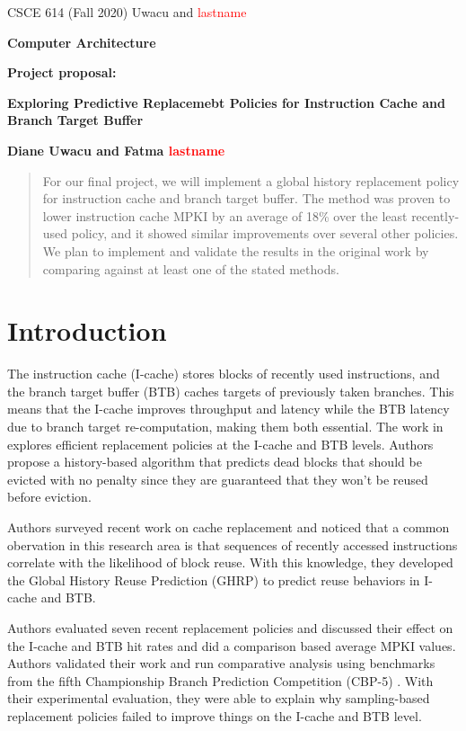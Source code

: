 \documentclass[11pt]{article}
\begin{document}
\centerline{CSCE 614 (Fall 2020) \hfill Uwacu and \textcolor{red}{lastname}}
\medskip
\centerline{\bf Computer Architecture}
\medskip

\centerline{\bf  Project proposal: }

\bigskip

\centerline{\bf Exploring Predictive Replacemebt Policies for Instruction Cache and Branch Target Buffer}

\bigskip

\centerline{\bf Diane Uwacu and Fatma \textcolor{red}{lastname}}

\bigskip

\begin{abstract}
	For our final project, we will implement a global history replacement policy for instruction cache and branch target buffer.
	The method was proven to lower instruction cache MPKI by an average of 18\% over the least recently-used policy, and it showed
	similar improvements over several other policies.
	We plan to implement and validate the results in the original work by comparing against at least one of the stated methods.
 \end{abstract}

\section{Introduction} 
The instruction cache (I-cache) stores blocks of recently used instructions, and the branch target buffer (BTB) caches targets of previously taken branches. 
This means that the I-cache improves throughput and latency while the BTB latency due to branch target re-computation, making them both essential.
The work in \cite{samira-ISCA18} explores efficient replacement policies at the I-cache and BTB levels. Authors propose a history-based algorithm that predicts
dead blocks that should be evicted with no penalty since they are guaranteed that they won't be reused before eviction.

Authors surveyed recent work on cache replacement and noticed that a common obervation in this research area is that sequences of recently accessed instructions
correlate with the likelihood of block reuse. With this knowledge, they developed the Global History Reuse Prediction (GHRP) to predict reuse behaviors in I-cache and BTB.

Authors evaluated seven recent replacement policies and discussed their effect on the I-cache and BTB hit rates and did a comparison based average MPKI values.
Authors validated their work and run comparative analysis using benchmarks from the fifth Championship Branch Prediction Competition (CBP-5) \cite{cbp-5}.
With their experimental evaluation, they were able to explain why sampling-based replacement policies failed to improve things on the I-cache and BTB level.
\end{document}
